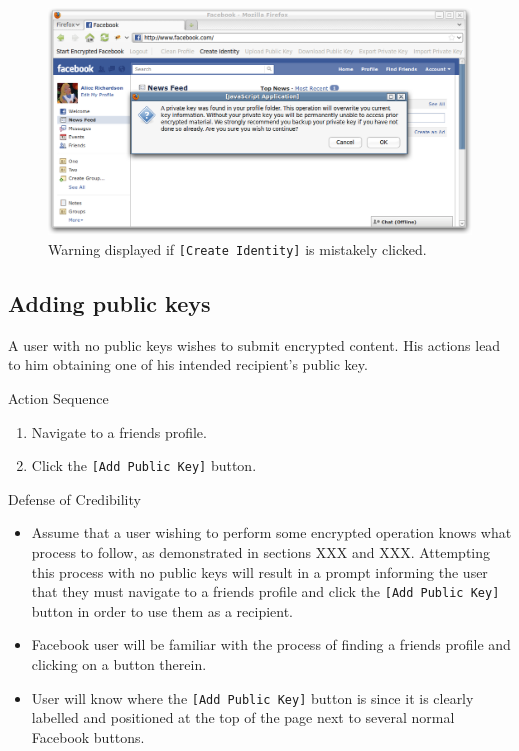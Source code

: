     \begin{figure}[tbph]
        \begin{center}
        
                \includegraphics[width=12cm]{screens/create-warning.png}

            \caption{Warning displayed if {\tt [Create Identity]} is mistakely clicked.}
            \label{scn:create}
        \end{center}
    \end{figure}

\subsection{Adding public keys}
A user with no public keys wishes to submit encrypted content. His actions lead to him obtaining one of his intended recipient's public key.

\begin{desc}

    \item[Action Sequence] \hfill
    \begin{enumerate}
        \item Navigate to a friends profile.
        \item Click the {\tt [Add Public Key]} button.
    \end{enumerate}
    
    \item[Defense of Credibility] \hfill
    \begin{itemize}
        \item Assume that a user wishing to perform some encrypted operation knows what process to follow, as demonstrated in sections XXX and XXX. Attempting this process with no public keys will result in a prompt informing the user that they must navigate to a friends profile and click the {\tt [Add Public Key]} button in order to use them as a recipient.
    
        \item Facebook user will be familiar with the process of finding a friends profile and clicking on a button therein.
        
        \item User will know where the {\tt [Add Public Key]} button is since it is clearly labelled and positioned at the top of the page next to several normal Facebook buttons.
        
    \end{itemize}
    
\end{desc}

